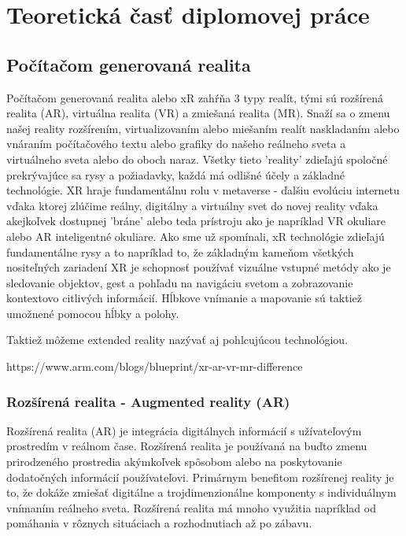 \section{Teoretická časť diplomovej práce}

\subsection{Počítačom generovaná realita}
Počítačom generovaná realita alebo xR zahŕňa 3 typy realít, tými sú rozšírená realita (AR), virtuálna realita (VR) a zmiešaná realita (MR). Snaží sa o zmenu našej reality rozšírením, virtualizovaním alebo miešaním realít naskladaním alebo vnáraním počítačového textu alebo grafiky do našeho reálneho sveta a virtuálneho sveta alebo do oboch naraz. Všetky tieto 'reality' zdieľajú spoločné prekrývajúce sa rysy a požiadavky, každá má odlišné účely a základné technológie. XR hraje fundamentálnu rolu v metaverse - ďalšiu evolúciu internetu vďaka ktorej zlúčime reálny, digitálny a virtuálny svet do novej reality vďaka akejkoľvek dostupnej 'bráne' alebo teda prístroju ako je napríklad VR okuliare alebo AR inteligentné okuliare. Ako sme už spomínali, xR technológie zdieľajú fundamentálne rysy a to napríklad to, že základným kameňom všetkých nositeľných zariadení XR je schopnosť používať vizuálne vstupné metódy ako je sledovanie objektov, gest a pohľadu na navigáciu svetom a zobrazovanie kontextovo citlivých informácií. Hĺbkove vnímanie a mapovanie sú taktiež umožnené pomocou hĺbky a polohy. 

Taktiež môžeme extended reality nazývať aj pohlcujúcou technológiou.

https://www.arm.com/blogs/blueprint/xr-ar-vr-mr-difference

\subsubsection{Rozšírená realita - Augmented reality (AR)}

Rozšírená realita (AR) je integrácia digitálnych informácií s užívateľovým prostredím v reálnom čase. Rozšírená realita je používaná na buďto zmenu prirodzeného prostredia akýmkoľvek spôsobom alebo na poskytovanie dodatočných informácií používateľovi. Primárnym benefitom rozšírenej reality je to, že dokáže zmiešať digitálne a trojdimenzionálne komponenty s individuálnym vnímaním reálneho sveta. Rozšírená realita má mnoho využitia napríklad od pomáhania v rôznych situáciach a rozhodnutiach až po zábavu.

